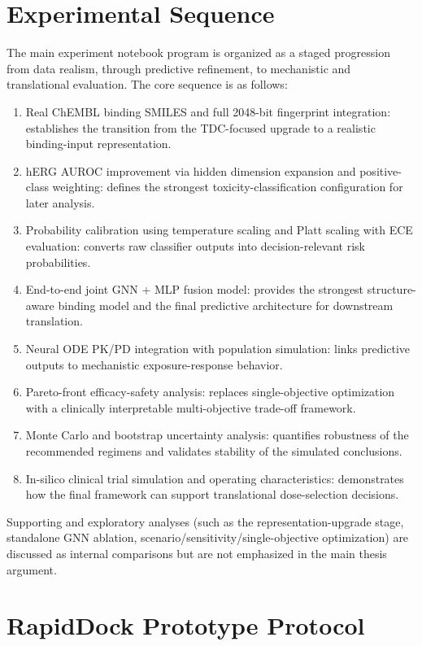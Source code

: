 \documentclass[a4paper,11pt,twoside]{report}
\begin{document}
\section{Experimental Sequence}

The main experiment notebook program is organized as a staged progression from data realism, through predictive refinement, to mechanistic and translational evaluation. The core sequence is as follows:
\begin{enumerate}
  \item Real ChEMBL binding SMILES and full 2048-bit fingerprint integration: establishes the transition from the TDC-focused upgrade to a realistic binding-input representation.
  \item hERG AUROC improvement via hidden dimension expansion and positive-class weighting: defines the strongest toxicity-classification configuration for later analysis.
  \item Probability calibration using temperature scaling and Platt scaling with ECE evaluation: converts raw classifier outputs into decision-relevant risk probabilities.
  \item End-to-end joint GNN + MLP fusion model: provides the strongest structure-aware binding model and the final predictive architecture for downstream translation.
  \item Neural ODE PK/PD integration with population simulation: links predictive outputs to mechanistic exposure-response behavior.
  \item Pareto-front efficacy-safety analysis: replaces single-objective optimization with a clinically interpretable multi-objective trade-off framework.
  \item Monte Carlo and bootstrap uncertainty analysis: quantifies robustness of the recommended regimens and validates stability of the simulated conclusions.
  \item In-silico clinical trial simulation and operating characteristics: demonstrates how the final framework can support translational dose-selection decisions.
\end{enumerate}

Supporting and exploratory analyses (such as the representation-upgrade stage, standalone GNN ablation, scenario/sensitivity/single-objective optimization) are discussed as internal comparisons but are not emphasized in the main thesis argument.

\section{RapidDock Prototype Protocol}
\end{document}
